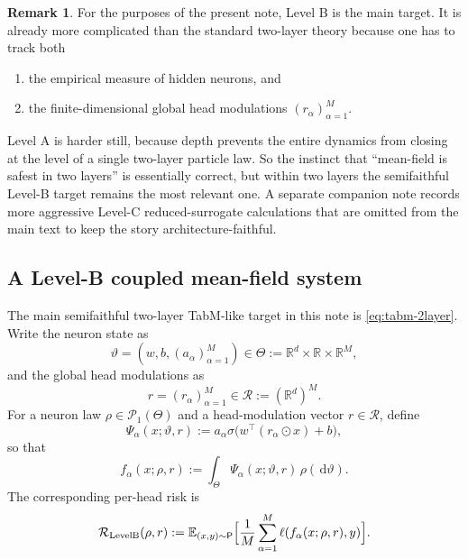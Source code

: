 \documentclass[11pt]{article}
\theoremstyle{definition}
\newtheorem{remark}[theorem]{Remark}
\newcommand{\R}{\mathbb{R}}
\newcommand{\E}{\mathbb{E}}
\newcommand{\PP}{\mathcal{P}}
\newcommand{\dd}{\,\mathrm{d}}
\begin{document}
\begin{remark}
For the purposes of the present note, Level B is the main target.
It is already more complicated than the standard two-layer theory because one has to track both
\begin{enumerate}[leftmargin=2em]
  \item the empirical measure of hidden neurons, and
  \item the finite-dimensional global head modulations $(r_\alpha)_{\alpha=1}^M$.
\end{enumerate}
Level A is harder still, because depth prevents the entire dynamics from closing at the level of a single two-layer particle law.
So the instinct that ``mean-field is safest in two layers'' is essentially correct, but within two layers the semifaithful Level-B target remains the most relevant one.
A separate companion note records more aggressive Level-C reduced-surrogate calculations that are omitted from the main text to keep the story architecture-faithful.
\end{remark}

\subsection{A Level-B coupled mean-field system}

The main semifaithful two-layer TabM-like target in this note is \eqref{eq:tabm-2layer}.
Write the neuron state as
\[
  \vartheta=(w,b,(a_\alpha)_{\alpha=1}^M)
  \in
  \Theta
  :=
  \R^d\times \R \times \R^M,
\]
and the global head modulations as
\[
  r=(r_\alpha)_{\alpha=1}^M\in \mathcal{R}:=(\R^d)^M.
\]
For a neuron law $\rho\in \PP_1(\Theta)$ and a head-modulation vector $r\in\mathcal R$, define
\[
  \Psi_\alpha(x;\vartheta,r)
  :=
  a_\alpha \sigma\bigl(w^\top (r_\alpha\odot x)+b\bigr),
\]
so that
\begin{equation}
  f_\alpha(x;\rho,r)
  :=
  \int_\Theta
  \Psi_\alpha(x;\vartheta,r)
  \,\rho(\dd \vartheta).
  \label{eq:levelb-output}
\end{equation}
The corresponding per-head risk is
\begin{equation}
  \mathcal R_{\mathrm{LevelB}}(\rho,r)
  :=
  \E_{(x,y)\sim \mathsf P}
  \Bigl[
    \frac1M\sum_{\alpha=1}^M
    \ell(f_\alpha(x;\rho,r),y)
  \Bigr].
  \label{eq:levelb-risk}
\end{equation}
\end{document}
